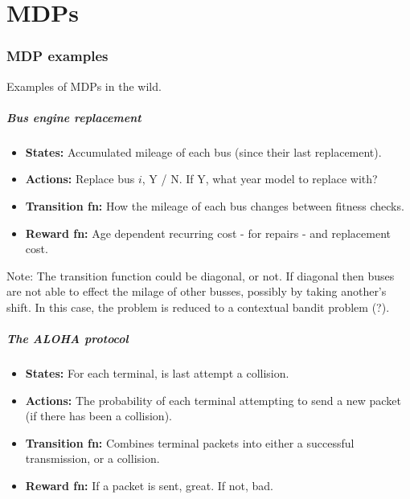 \chapter{MDPs}

\subsection{MDP examples}
Examples of MDPs in the wild.

\hypertarget{bus-engine-replacement}{%
\paragraph{Bus engine replacement}\label{bus-engine-replacement}}

\begin{itemize}
\tightlist
\item
  \textbf{States:} Accumulated mileage of each bus (since their last
  replacement).
\item
  \textbf{Actions:} Replace bus \(i\), Y / N. If Y, what year model to
  replace with?
\item
  \textbf{Transition fn:} How the mileage of each bus changes between
  fitness checks.
\item
  \textbf{Reward fn:} Age dependent recurring cost - for repairs - and
  replacement cost.
\end{itemize}

Note: The transition function could be diagonal, or not. If diagonal
then buses are not able to effect the milage of other busses, possibly
by taking another's shift. In this case, the problem is reduced to a
contextual bandit problem (?).

\cite{Putterman2015}

\hypertarget{the-aloha-protocol}{%
\paragraph{The ALOHA protocol}\label{the-aloha-protocol}}

\begin{itemize}
\tightlist
\item
  \textbf{States:} For each terminal, is last attempt a collision.
\item
  \textbf{Actions:} The probability of each terminal attempting to send
  a new packet (if there has been a collision).
\item
  \textbf{Transition fn:} Combines terminal packets into either a
  successful transmission, or a collision.
\item
  \textbf{Reward fn:} If a packet is sent, great. If not, bad.
\end{itemize}

